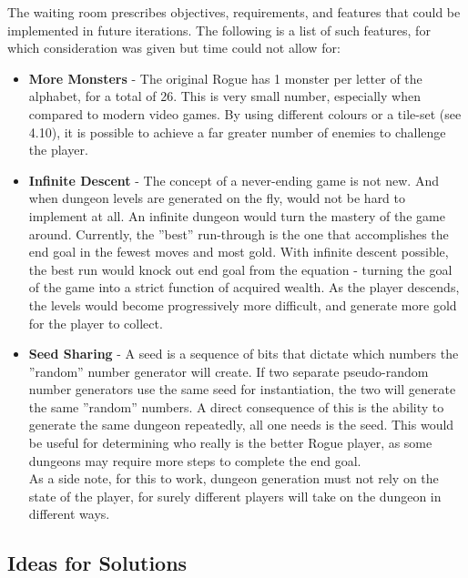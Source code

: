 \documentclass[12pt, titlepage]{article}
\begin{document}
		The waiting room prescribes objectives, requirements, and features that could be implemented in future iterations. The following is a list of such features, for which consideration was given but time could not allow for:
		\begin{itemize}
			\item \textbf{More Monsters} - The original Rogue has 1 monster per letter of the alphabet, for a total of 26. This is very small number, especially when compared to modern video games. By using different colours or a tile-set (see 4.10), it is possible to achieve a far greater number of enemies to challenge the player.

			\item \textbf{Infinite Descent} -  The concept of a never-ending game is not new. And when dungeon levels are generated on the fly, would not be hard to implement at all. An infinite dungeon would turn the mastery of the game around. Currently, the ''best'' run-through is the one that accomplishes the end goal in the fewest moves and most gold. With infinite descent possible, the best run would knock out end goal from the equation - turning the goal of the game into a strict function of acquired wealth. As the player descends, the levels would become progressively more difficult, and generate more gold for the player to collect.

			\item \textbf{Seed Sharing} -  A seed is a sequence of bits that dictate which numbers the ''random'' number generator will create. If two separate pseudo-random number generators use the same seed for instantiation, the two will generate the same ''random'' numbers. A direct consequence of this is the ability to generate the same dungeon repeatedly, all one needs is the seed. This would be useful for determining who really is the better Rogue player, as some dungeons may require more steps to complete the end goal.\\

			As a side note, for this to work, dungeon generation must not rely on the state of the player, for surely different players will take on the dungeon in different ways.
		\end{itemize}

	\subsection{Ideas for Solutions}
\end{document}
